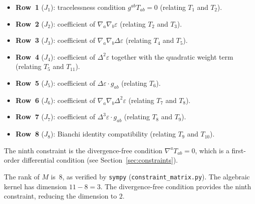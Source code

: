 \documentclass[11pt,a4paper]{article}
\begin{document}
\begin{itemize}
  \item \textbf{Row~1} ($J_1$): tracelessness condition
    $g^{ab}T_{ab} = 0$ (relating $T_1$ and $T_2$).
  \item \textbf{Row~2} ($J_2$): coefficient of
    $\nabla_a\nabla_b\varepsilon$ (relating $T_2$ and $T_3$).
  \item \textbf{Row~3} ($J_3$): coefficient of
    $\nabla_a\nabla_b\Delta\varepsilon$ (relating $T_4$ and $T_5$).
  \item \textbf{Row~4} ($J_4$): coefficient of $\Delta^2\varepsilon$
    together with the quadratic weight term (relating $T_5$ and $T_{11}$).
  \item \textbf{Row~5} ($J_5$): coefficient of
    $\Delta\varepsilon\cdot g_{ab}$ (relating $T_6$).
  \item \textbf{Row~6} ($J_6$): coefficient of
    $\nabla_a\nabla_b\Delta^2\varepsilon$ (relating $T_7$ and $T_8$).
  \item \textbf{Row~7} ($J_7$): coefficient of
    $\Delta^3\varepsilon\cdot g_{ab}$ (relating $T_8$ and $T_9$).
  \item \textbf{Row~8} ($J_8$): Bianchi identity compatibility
    (relating $T_9$ and $T_{10}$).
\end{itemize}

The ninth constraint is the divergence-free condition
$\nabla^a T_{ab} = 0$, which is a first-order differential condition
(see Section~\ref{sec:constraints}).

The rank of $M$ is~$8$, as verified by \texttt{sympy}
(\texttt{constraint\_matrix.py}). The algebraic kernel has dimension
$11 - 8 = 3$. The divergence-free condition provides the ninth constraint,
reducing the dimension to $2$.
\end{document}
